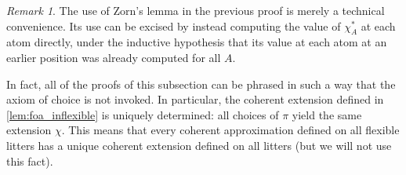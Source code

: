 \documentclass[112pt]{article}
\theoremstyle{definition}
\theoremstyle{remark}
\newtheorem{remark}[theorem]{Remark}
\begin{document}
\begin{remark}
  The use of Zorn's lemma in the previous proof is merely a technical convenience.
  Its use can be excised by instead computing the value of \( \chi_A^* \) at each atom directly, under the inductive hypothesis that its value at each atom at an earlier position was already computed for all \( A \).

  In fact, all of the proofs of this subsection can be phrased in such a way that the axiom of choice is not invoked.
  In particular, the coherent extension defined in \ref{lem:foa_inflexible} is uniquely determined: all choices of \( \pi \) yield the same extension \( \chi \).
  This means that every coherent approximation defined on all flexible litters has a unique coherent extension defined on all litters (but we will not use this fact).
\end{remark}
\end{document}
